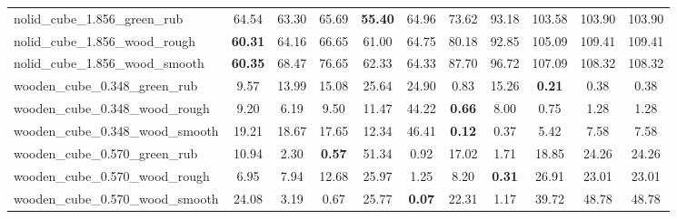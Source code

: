 \begin{table}[H]
{\begin{tabular}{l cccccccccc}
        nolid\_cube\_1.856\_green\_rub & 64.54 & 63.30 & 65.69 & \textbf{55.40} & 64.96 & 73.62 & 93.18 & 103.58 & 103.90 & 103.90 \\
        nolid\_cube\_1.856\_wood\_rough & \textbf{60.31} & 64.16 & 66.65 & 61.00 & 64.75 & 80.18 & 92.85 & 105.09 & 109.41 & 109.41 \\
        nolid\_cube\_1.856\_wood\_smooth & \textbf{60.35} & 68.47 & 76.65 & 62.33 & 64.33 & 87.70 & 96.72 & 107.09 & 108.32 & 108.32 \\
        wooden\_cube\_0.348\_green\_rub & 9.57 & 13.99 & 15.08 & 25.64 & 24.90 & 0.83 & 15.26 & \textbf{0.21} & 0.38 & 0.38 \\
        wooden\_cube\_0.348\_wood\_rough & 9.20 & 6.19 & 9.50 & 11.47 & 44.22 & \textbf{0.66} & 8.00 & 0.75 & 1.28 & 1.28 \\
        wooden\_cube\_0.348\_wood\_smooth & 19.21 & 18.67 & 17.65 & 12.34 & 46.41 & \textbf{0.12} & 0.37 & 5.42 & 7.58 & 7.58 \\
        wooden\_cube\_0.570\_green\_rub & 10.94 & 2.30 & \textbf{0.57} & 51.34 & 0.92 & 17.02 & 1.71 & 18.85 & 24.26 & 24.26 \\
        wooden\_cube\_0.570\_wood\_rough & 6.95 & 7.94 & 12.68 & 25.97 & 1.25 & 8.20 & \textbf{0.31} & 26.91 & 23.01 & 23.01 \\
        wooden\_cube\_0.570\_wood\_smooth & 24.08 & 3.19 & 0.67 & 25.77 & \textbf{0.07} & 22.31 & 1.17 & 39.72 & 48.78 & 48.78 \\
        \bottomrule
    \end{tabular}
    }
\end{table}



\vspace{1cm}

\clearpage

